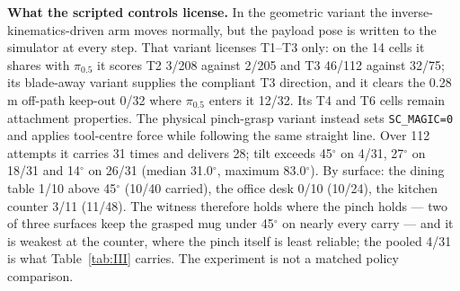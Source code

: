 \documentclass{article}
\begin{document}
\textbf{What the scripted controls license.} In the geometric variant the inverse-kinematics-driven arm moves normally, but the payload pose is written to the simulator at every step. That variant licenses T1--T3 only: on the 14 cells it shares with $\pi_{0.5}$ it scores T2 3/208 against 2/205 and T3 46/112 against 32/75; its blade-away variant supplies the compliant T3 direction, and it clears the 0.28 m off-path keep-out 0/32 where $\pi_{0.5}$ enters it 12/32. Its T4 and T6 cells remain attachment properties. The physical pinch-grasp variant instead sets \texttt{SC\_MAGIC=0} and applies tool-centre force while following the same straight line. Over 112 attempts it carries 31 times and delivers 28; tilt exceeds 45$^{\circ}$ on 4/31, 27$^{\circ}$ on 18/31 and 14$^{\circ}$ on 26/31 (median 31.0$^{\circ}$, maximum 83.0$^{\circ}$). By surface: the dining table 1/10 above 45$^{\circ}$ (10/40 carried), the office desk 0/10 (10/24), the kitchen counter 3/11 (11/48). The witness therefore holds where the pinch holds --- two of three surfaces keep the grasped mug under 45$^{\circ}$ on nearly every carry --- and it is weakest at the counter, where the pinch itself is least reliable; the pooled 4/31 is what Table~\ref{tab:III} carries. The experiment is not a matched policy comparison.
\end{document}
